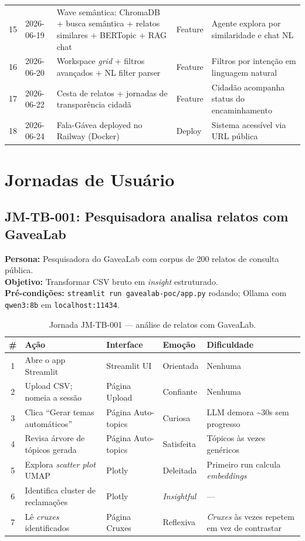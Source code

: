 \documentclass[12pt,a4paper]{article}
\begin{document}
\begin{longtable}{>{\small}c >{\small}p{2cm} >{\small}p{6cm} >{\small}p{2cm} >{\small}p{3cm}}
15 & 2026-06-19 & Wave semântica: ChromaDB + busca semântica + relatos similares + BERTopic + RAG chat & Feature & Agente explora por similaridade e chat NL \\
16 & 2026-06-20 & Workspace \textit{grid} + filtros avançados + NL filter parser & Feature & Filtros por intenção em linguagem natural \\
17 & 2026-06-22 & Cesta de relatos + jornadas de transparência cidadã & Feature & Cidadão acompanha status do encaminhamento \\
18 & 2026-06-24 & Fala-Gávea deployed no Railway (Docker) & Deploy & Sistema acessível via URL pública \\
\bottomrule
\end{longtable}

\section{Jornadas de Usuário}

\subsection{JM-TB-001: Pesquisadora analisa relatos com GaveaLab}

\textbf{Persona:} Pesquisadora do GaveaLab com corpus de 200 relatos de consulta pública.\\
\textbf{Objetivo:} Transformar CSV bruto em \textit{insight} estruturado.\\
\textbf{Pré-condições:} \texttt{streamlit run gavealab-poc/app.py} rodando; Ollama com \texttt{qwen3:8b} em \texttt{localhost:11434}.

\begin{table}[h!]
\centering
\small
\begin{tabular}{clllp{3cm}}
\toprule
\textbf{\#} & \textbf{Ação} & \textbf{Interface} & \textbf{Emoção} & \textbf{Dificuldade} \\
\midrule
1 & Abre o app Streamlit & Streamlit UI & Orientada & Nenhuma \\
2 & Upload CSV; nomeia a sessão & Página Upload & Confiante & Nenhuma \\
3 & Clica ``Gerar temas automáticos'' & Página Auto-topics & Curiosa & LLM demora \textasciitilde{}30s sem progresso \\
4 & Revisa árvore de tópicos gerada & Página Auto-topics & Satisfeita & Tópicos às vezes genéricos \\
5 & Explora \textit{scatter plot} UMAP & Plotly & Deleitada & Primeiro run calcula \textit{embeddings} \\
6 & Identifica cluster de reclamações & Plotly & \textit{Insightful} & — \\
7 & Lê \textit{cruxes} identificados & Página Cruxes & Reflexiva & \textit{Cruxes} às vezes repetem em vez de contrastar \\
\bottomrule
\end{tabular}
\caption{Jornada JM-TB-001 — análise de relatos com GaveaLab.}
\end{table}
\end{document}
